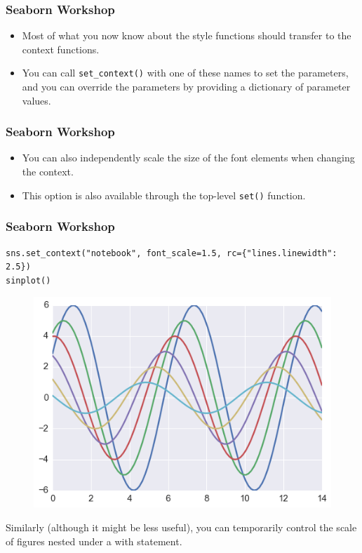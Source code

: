 \documentclass{beamer}
\begin{document}
\begin{frame}[fragile]
	\frametitle{Seaborn Workshop}
	\large 
\begin{itemize}
\item Most of what you now know about the style functions should transfer to the context functions.
\item You can call \texttt{set\_context()} with one of these names to set the parameters, and you can override the parameters by providing a dictionary of parameter values.
\end{itemize}
\end{frame}
\begin{frame}[fragile]
	\frametitle{Seaborn Workshop}
	\large
	\begin{itemize}
\item You can also independently scale the size of the font elements when changing the context. 
\item This option is also available through the top-level \texttt{set()} function.
	\end{itemize}

\end{frame}
\begin{frame}[fragile]
	\frametitle{Seaborn Workshop}
	\large
\begin{verbatim}
sns.set_context("notebook", font_scale=1.5, rc={"lines.linewidth": 2.5})
sinplot()
\end{verbatim}

\begin{figure}
	\centering
	\includegraphics[width=0.7\linewidth]{images/aesthetics_39_0}
\end{figure}

Similarly (although it might be less useful), you can temporarily control the scale of figures nested under a with statement.
\end{frame}
\end{document}
